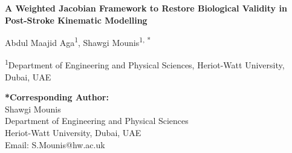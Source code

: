 \documentclass[12pt, a4paper]{article}
\begin{document}
\begin{center}
    \Large\textbf{A Weighted Jacobian Framework to Restore Biological Validity in Post-Stroke Kinematic Modelling}
    
    \vspace{1em}
    \normalsize
    Abdul Maajid Aga\textsuperscript{1}, Shawgi Mounis\textsuperscript{1, *}
    
    \vspace{1em}
    \textsuperscript{1}Department of Engineering and Physical Sciences, Heriot-Watt University, Dubai, UAE
    
    \vspace{2em}
    \textbf{*Corresponding Author:}\\
    Shawgi Mounis\\
    Department of Engineering and Physical Sciences\\
    Heriot-Watt University, Dubai, UAE\\
    Email: S.Mounis@hw.ac.uk
\end{center}

\clearpage

\end{document}
